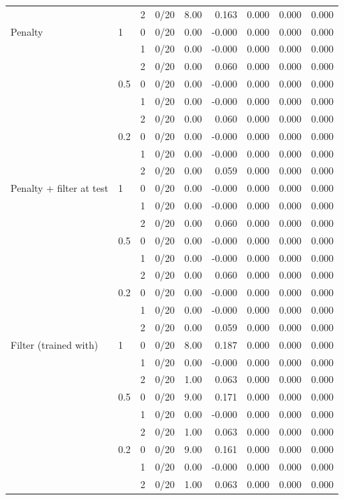 {\begin{tabular}{llrrrrrrr}
 &  & 2 & 0/20 & 8.00 & 0.163 & 0.000 & 0.000 & 0.000 \\
\addlinespace
Penalty & 1 & 0 & 0/20 & 0.00 & -0.000 & 0.000 & 0.000 & 0.000 \\
 &  & 1 & 0/20 & 0.00 & -0.000 & 0.000 & 0.000 & 0.000 \\
 &  & 2 & 0/20 & 0.00 & 0.060 & 0.000 & 0.000 & 0.000 \\
 & 0.5 & 0 & 0/20 & 0.00 & -0.000 & 0.000 & 0.000 & 0.000 \\
 &  & 1 & 0/20 & 0.00 & -0.000 & 0.000 & 0.000 & 0.000 \\
 &  & 2 & 0/20 & 0.00 & 0.060 & 0.000 & 0.000 & 0.000 \\
 & 0.2 & 0 & 0/20 & 0.00 & -0.000 & 0.000 & 0.000 & 0.000 \\
 &  & 1 & 0/20 & 0.00 & -0.000 & 0.000 & 0.000 & 0.000 \\
 &  & 2 & 0/20 & 0.00 & 0.059 & 0.000 & 0.000 & 0.000 \\
\addlinespace
Penalty + filter at test & 1 & 0 & 0/20 & 0.00 & -0.000 & 0.000 & 0.000 & 0.000 \\
 &  & 1 & 0/20 & 0.00 & -0.000 & 0.000 & 0.000 & 0.000 \\
 &  & 2 & 0/20 & 0.00 & 0.060 & 0.000 & 0.000 & 0.000 \\
 & 0.5 & 0 & 0/20 & 0.00 & -0.000 & 0.000 & 0.000 & 0.000 \\
 &  & 1 & 0/20 & 0.00 & -0.000 & 0.000 & 0.000 & 0.000 \\
 &  & 2 & 0/20 & 0.00 & 0.060 & 0.000 & 0.000 & 0.000 \\
 & 0.2 & 0 & 0/20 & 0.00 & -0.000 & 0.000 & 0.000 & 0.000 \\
 &  & 1 & 0/20 & 0.00 & -0.000 & 0.000 & 0.000 & 0.000 \\
 &  & 2 & 0/20 & 0.00 & 0.059 & 0.000 & 0.000 & 0.000 \\
\addlinespace
Filter (trained with) & 1 & 0 & 0/20 & 8.00 & 0.187 & 0.000 & 0.000 & 0.000 \\
 &  & 1 & 0/20 & 0.00 & -0.000 & 0.000 & 0.000 & 0.000 \\
 &  & 2 & 0/20 & 1.00 & 0.063 & 0.000 & 0.000 & 0.000 \\
 & 0.5 & 0 & 0/20 & 9.00 & 0.171 & 0.000 & 0.000 & 0.000 \\
 &  & 1 & 0/20 & 0.00 & -0.000 & 0.000 & 0.000 & 0.000 \\
 &  & 2 & 0/20 & 1.00 & 0.063 & 0.000 & 0.000 & 0.000 \\
 & 0.2 & 0 & 0/20 & 9.00 & 0.161 & 0.000 & 0.000 & 0.000 \\
 &  & 1 & 0/20 & 0.00 & -0.000 & 0.000 & 0.000 & 0.000 \\
 &  & 2 & 0/20 & 1.00 & 0.063 & 0.000 & 0.000 & 0.000 \\
\bottomrule\end{tabular}}
